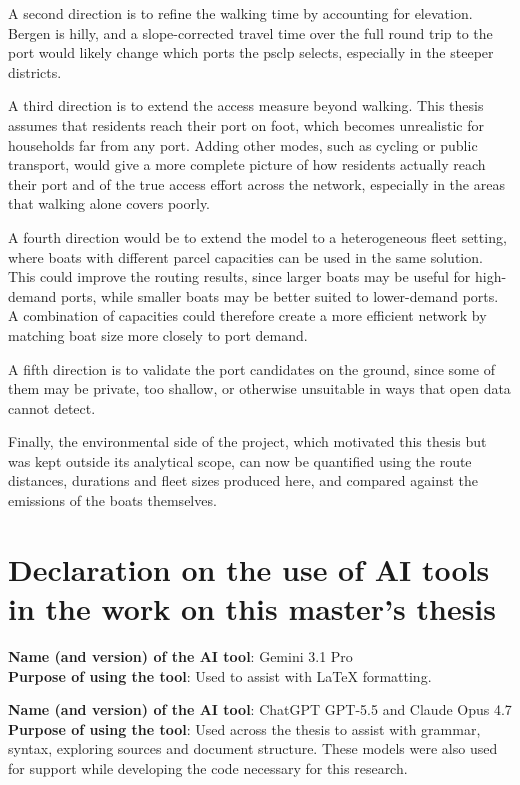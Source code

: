 \documentclass[12pt]{article}
\begin{document}
A second direction is to refine the walking time by accounting for elevation. Bergen is hilly, and a slope-corrected travel time over the full round trip to the port would likely change which ports the \ac{psclp} selects, especially in the steeper districts.

A third direction is to extend the access measure beyond walking. This thesis assumes that residents reach their port on foot, which becomes unrealistic for households far from any port. Adding other modes, such as cycling or public transport, would give a more complete picture of how residents actually reach their port and of the true access effort across the network, especially in the areas that walking alone covers poorly.

A fourth direction would be to extend the model to a heterogeneous fleet setting, where boats with different parcel capacities can be used in the same solution. This could improve the routing results, since larger boats may be useful for high-demand ports, while smaller boats may be better suited to lower-demand ports. A combination of capacities could therefore create a more efficient network by matching boat size more closely to port demand.

A fifth direction is to validate the port candidates on the ground, since some of them may be private, too shallow, or otherwise unsuitable in ways that open data cannot detect.

Finally, the environmental side of the project, which motivated this thesis but was kept outside its analytical scope, can now be quantified using the route distances, durations and fleet sizes produced here, and compared against the emissions of the boats themselves.

\clearpage
\printbibliography
\appendix

\section*{Declaration on the use of AI tools in the work on this master's thesis}

\noindent \textbf{Name (and version) of the AI tool}: Gemini 3.1 Pro \\
\textbf{Purpose of using the tool}: Used to assist with LaTeX formatting.

\vspace{1em}

\noindent \textbf{Name (and version) of the AI tool}: ChatGPT GPT-5.5 and Claude Opus 4.7 \\
\textbf{Purpose of using the tool}: Used across the thesis to assist with grammar, syntax, exploring sources and document structure. These models were also used for support while developing the code necessary for this research.
\end{document}
